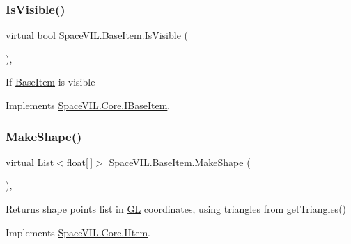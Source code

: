 \mbox{\label{class_space_v_i_l_1_1_base_item_a29b915d6e655b48a8b7505118441e961}} 
\subsubsection{\texorpdfstring{Is\+Visible()}{IsVisible()}}
{\footnotesize\ttfamily virtual bool Space\+V\+I\+L.\+Base\+Item.\+Is\+Visible (\begin{DoxyParamCaption}{ }\end{DoxyParamCaption})\hspace{0.3cm}{\ttfamily [inline]}, {\ttfamily [virtual]}}



If \mbox{\hyperlink{class_space_v_i_l_1_1_base_item}{Base\+Item}} is visible 



Implements \mbox{\hyperlink{interface_space_v_i_l_1_1_core_1_1_i_base_item}{Space\+V\+I\+L.\+Core.\+I\+Base\+Item}}.

\mbox{\label{class_space_v_i_l_1_1_base_item_ac111d3d8cef36f406aa11862cefab9e2}} 
\subsubsection{\texorpdfstring{Make\+Shape()}{MakeShape()}}
{\footnotesize\ttfamily virtual List$<$float\mbox{[}$\,$\mbox{]}$>$ Space\+V\+I\+L.\+Base\+Item.\+Make\+Shape (\begin{DoxyParamCaption}{ }\end{DoxyParamCaption})\hspace{0.3cm}{\ttfamily [inline]}, {\ttfamily [virtual]}}

\begin{DoxyReturn}{Returns}
shape points list in \mbox{\hyperlink{namespace_g_l}{GL}} coordinates, using triangles from get\+Triangles()
\end{DoxyReturn}


Implements \mbox{\hyperlink{interface_space_v_i_l_1_1_core_1_1_i_item}{Space\+V\+I\+L.\+Core.\+I\+Item}}.



